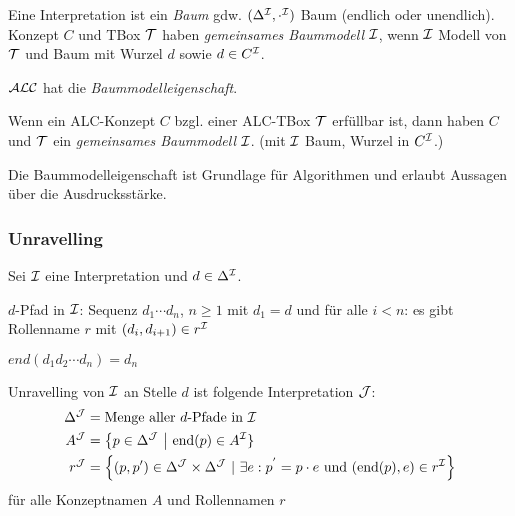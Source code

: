 Eine Interpretation ist ein \emph{Baum} gdw. $(\Delta^{\mathcal{I}}, \cdot^{\mathcal{I}})$
Baum (endlich oder unendlich). Konzept $C$ und TBox $\mathcal{T}$ haben
\emph{gemeinsames Baummodell} $\mathcal{I}$, wenn $\mathcal{I}$ Modell von $\mathcal{T}$ und Baum mit
Wurzel $d$ sowie $d \in C^{\mathcal{I}}$.


$\mathcal{A}\mathcal{L}\mathcal{C}$ hat die \emph{Baummodelleigenschaft}.

\begin{theorem}
    \label{theorem-3.6}
    \label{thm:baummodell}
Wenn ein ALC-Konzept $C$ bzgl. einer ALC-TBox $\mathcal{T}$ erfüllbar ist,
dann haben $C$ und $\mathcal{T}$ ein \emph{gemeinsames Baummodell} $\mathcal{I}$. (mit $\mathcal{I}$ Baum, Wurzel in $C^{\mathcal{I}}$.)
\end{theorem}

\begin{tafel}[TODO]

\end{tafel}

Die Baummodelleigenschaft ist Grundlage für Algorithmen und erlaubt Aussagen über die Ausdrucksstärke.

\subsubsection{Unravelling}\label{unravelling}

Sei $\mathcal{I}$ eine Interpretation und $d \in \Delta^{\mathcal{I}}$. 

$d$-Pfad in $\mathcal{I}$: Sequenz $d_1\cdots d_n$, $n \geq 1$ mit $d_1 = d$ und
für alle $i < n$: es gibt Rollenname $r$ mit $(d_i, d_{i + 1}) \in r^{\mathcal{I}}$

$\mathit{end}(d_1d_2\cdots d_n) = d_n$

\begin{definition}[Unravelling]
Unravelling von $\mathcal{I}$ an Stelle $d$ ist folgende Interpretation $\mathcal{J}$:
\begin{align*}
    \Delta^{\MJ} &= \text{Menge aller }d\text{-Pfade in }\MI\\
    A^{\MJ} &= \left\{ p \in \Delta^{\MJ}\  \right|\text{\ end}\left( p \right) \in A^\MI\}\\
    r^{\MJ} &= \left\{ \left( p,p' \right) \in \Delta^{\MJ} \times \Delta^{\MJ}\ |\ \exists e:p^{'} = p \cdot e\ \mathrm{\text{und}}\ \left( \text{end}\left( p \right),e \right) \in r^\MI \right\}
\end{align*}
für alle Konzeptnamen $A$ und Rollennamen $r$
\end{definition}

\begin{tafel}[TODO]

\end{tafel}

